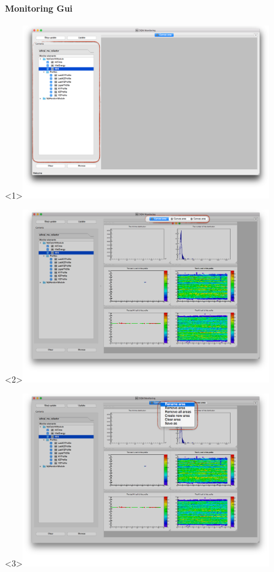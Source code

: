\documentclass[8pt]{beamer}
\begin{document}
  
\begin{frame}
    \frametitle{\secname}
    \framesubtitle{ Monitoring Gui }
    
        \begin{overlayarea}{\textwidth}{\textheight}
\vspace {-1em}
      \begin{center}

         \begin{onlyenv}<1>\includegraphics[width=0.8\textwidth]{figs/MonitoringGui/MG_Content}\end{onlyenv}
         \begin{onlyenv}<2>\includegraphics[width=0.8\textwidth]{figs/MonitoringGui/MG_Tabs}\end{onlyenv}
         \begin{onlyenv}<3>\includegraphics[width=0.8\textwidth]{figs/MonitoringGui/MG_TabsMenu}\end{onlyenv}

\end{center}
\end{overlayarea}
\end{frame}
\end{document}
